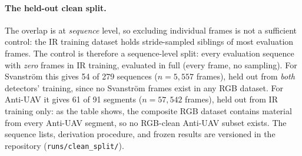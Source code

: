 \paragraph{The held-out clean split.} The overlap is at \emph{sequence} level, so excluding individual frames is not a sufficient control: the IR training dataset holds stride-sampled siblings of most evaluation frames. The control is therefore a sequence-level split: every evaluation sequence with \emph{zero} frames in IR training, evaluated in full (every frame, no sampling). For Svanstr\"om this gives 54 of 279 sequences ($n=5{,}557$ frames), held out from \emph{both} detectors' training, since no Svanstr\"om frames exist in any RGB dataset. For Anti-UAV it gives 61 of 91 segments ($n=57{,}542$ frames), held out from IR training only: as the table shows, the composite RGB dataset contains material from every Anti-UAV segment, so no RGB-clean Anti-UAV subset exists. The sequence lists, derivation procedure, and frozen results are versioned in the repository (\texttt{runs/clean\_split/}).


